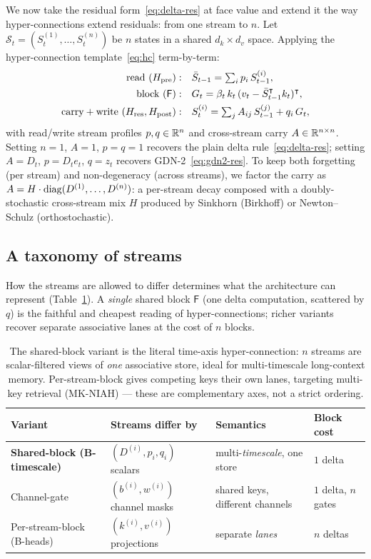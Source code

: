 \documentclass[11pt,letterpaper,logo]{yalearxiv}
\newcommand{\Hres}{H_{\mathrm{res}}}
\newcommand{\Hpre}{H_{\mathrm{pre}}}
\newcommand{\Hpost}{H_{\mathrm{post}}}
\newcommand{\Sbb}{\boldsymbol{\mathcal{S}}}    %
\newcommand{\Fdelta}{\mathsf{F}}               %
\begin{document}
We now take the residual form~\eqref{eq:delta-res} at face value and extend it the way
hyper-connections extend residuals: from one stream to $n$. Let
$\Sbb_{t} = (S_t^{(1)},\dots,S_t^{(n)})$ be $n$ states in a shared $d_k \times d_v$ space.
Applying the hyper-connection template~\eqref{eq:hc} term-by-term:
\begin{align}
  \text{read } (\Hpre): \quad
    & \bar S_{t-1} = \textstyle\sum_i p_i\, S_{t-1}^{(i)},
    \label{eq:b-read}\\
  \text{block } (\Fdelta): \quad
    & G_t = \beta_t\, k_t\,(v_t - \bar S_{t-1}^{\tr} k_t)^{\tr},
    \label{eq:b-block}\\
  \text{carry}+\text{write } (\Hres,\Hpost): \quad
    & S_t^{(i)} = \textstyle\sum_j A_{ij}\, S_{t-1}^{(j)} + q_i\, G_t ,
    \label{eq:b-update}
\end{align}
with read/write stream profiles $p, q \in \mathbb{R}^n$ and cross-stream carry $A \in \mathbb{R}^{n\times n}$.
Setting $n=1$, $A=1$, $p=q=1$ recovers the plain delta rule~\eqref{eq:delta-res}; setting
$A = D_t$, $p = D_t e_t$, $q = z_t$ recovers GDN-2~\eqref{eq:gdn2-res}. To keep both
forgetting (per stream) and non-degeneracy (across streams), we factor the carry as
$A = H \cdot \operatorname{diag}(D^{(1)},\dots,D^{(n)})$: a per-stream decay composed with a
doubly-stochastic cross-stream mix $H$ produced by Sinkhorn (Birkhoff) or Newton--Schulz
(orthostochastic).

\subsection{A taxonomy of streams}
How the streams are allowed to differ determines what the architecture can represent
(Table~\ref{tab:streams}). A \emph{single} shared block $\Fdelta$ (one delta computation,
scattered by $q$) is the faithful and cheapest reading of hyper-connections; richer variants
recover separate associative lanes at the cost of $n$ blocks.

\begin{table}[t]
\centering
\small
\begin{tabular}{@{}llll@{}}
\toprule
Variant & Streams differ by & Semantics & Block cost \\
\midrule
\textbf{Shared-block (B-timescale)} & $(D^{(i)}, p_i, q_i)$ scalars & multi-\emph{timescale}, one store & $1$ delta \\
Channel-gate & $(b^{(i)}, w^{(i)})$ channel masks & shared keys, different channels & $1$ delta, $n$ gates \\
Per-stream-block (B-heads) & $(k^{(i)}, v^{(i)})$ projections & separate \emph{lanes} & $n$ deltas \\
\bottomrule
\end{tabular}
\caption{The shared-block variant is the literal time-axis hyper-connection: $n$ streams
are scalar-filtered views of \emph{one} associative store, ideal for multi-timescale
long-context memory. Per-stream-block gives competing keys their own lanes, targeting
multi-key retrieval (MK-NIAH) --- these are complementary axes, not a strict ordering.}
\label{tab:streams}
\end{table}
\end{document}

